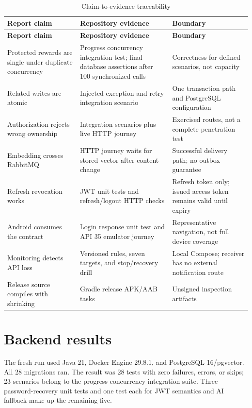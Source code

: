 \documentclass[12pt,a4paper,oneside]{report}
\newcommand{\backendtests}{28}
\newcommand{\integrationtests}{23}
\newcommand{\migrationcount}{28}
\begin{document}
\begin{longtable}{P{0.27\textwidth}P{0.31\textwidth}P{0.31\textwidth}}
\caption{Claim-to-evidence traceability}\label{tab:traceability}\\\toprule
\textbf{Report claim} & \textbf{Repository evidence} & \textbf{Boundary}\\\midrule\endfirsthead
\toprule\textbf{Report claim} & \textbf{Repository evidence} & \textbf{Boundary}\\\midrule\endhead
Protected rewards are single under duplicate concurrency & Progress concurrency integration test; final database assertions after 100 synchronized calls & Correctness for defined scenarios, not capacity\\
Related writes are atomic & Injected exception and retry integration scenario & One transaction path and PostgreSQL configuration\\
Authorization rejects wrong ownership & Integration scenarios plus live HTTP journey & Exercised routes, not a complete penetration test\\
Embedding crosses RabbitMQ & HTTP journey waits for stored vector after content change & Successful delivery path; no outbox guarantee\\
Refresh revocation works & JWT unit tests and refresh/logout HTTP checks & Refresh token only; issued access token remains valid until expiry\\
Android consumes the contract & Login response unit test and API 35 emulator journey & Representative navigation, not full device coverage\\
Monitoring detects API loss & Versioned rules, seven targets, and stop/recovery drill & Local Compose; receiver has no external notification route\\
Release source compiles with shrinking & Gradle release APK/AAB tasks & Unsigned inspection artifacts\\
\bottomrule
\end{longtable}

\section{Backend results}
The fresh run used Java 21, Docker Engine 29.8.1, and PostgreSQL 16/pgvector.
All \migrationcount{} migrations ran. The result was \backendtests{} tests with zero
failures, errors, or skips; \integrationtests{} scenarios belong to the progress
concurrency integration suite. Three password-recovery unit tests and one test each
for JWT semantics and AI fallback make up the remaining five.
\end{document}
